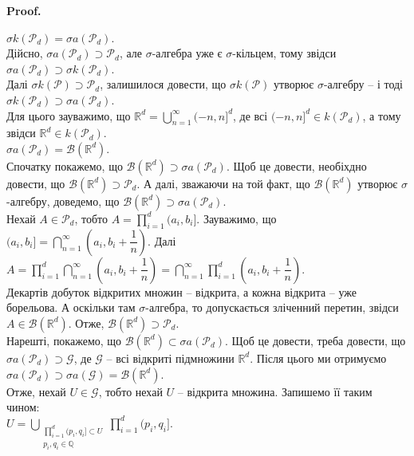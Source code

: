 \documentclass[a4paper, 10pt]{article}
\makeatletter
\theoremstyle{theoremdd}
\renewenvironment{proof}[1][Proof.\\]{\par
\pushQED{\hfill \qed}%
\normalfont \topsep6\p@\@plus6\p@\relax
\trivlist
\item\relax
{\bfseries
#1\@addpunct{.}}\hspace\labelsep\ignorespaces
}{%
\popQED\endtrivlist\@endpefalse
}
\makeatother
\begin{document}
\begin{proof}
$\sigma k(\mathcal{P}_d) = \sigma a(\mathcal{P}_d)$.\\
Дійсно, $\sigma a(\mathcal{P}_d) \supset \mathcal{P}_d$, але $\sigma$-алгебра уже є $\sigma$-кільцем, тому звідси $\sigma a(\mathcal{P}_d) \supset \sigma k(\mathcal{P}_d)$.\\
Далі $\sigma k(\mathcal{P}) \supset \mathcal{P}_d$, залишилося довести, що $\sigma k(\mathcal{P})$ утворює $\sigma$-алгебру -- і тоді $\sigma k(\mathcal{P}_d) \supset \sigma a(\mathcal{P}_d)$. \\
Для цього зауважимо, що $\mathbb{R}^d = \displaystyle\bigcup_{n =1}^\infty (-n,n]^d$, де всі $(-n,n]^d \in k(\mathcal{P}_d)$, а тому звідси $\mathbb{R}^d \in k(\mathcal{P}_d)$.
\bigskip \\
$\sigma a(\mathcal{P}_d) = \mathcal{B}(\mathbb{R}^d)$.\\
Спочатку покажемо, що $\mathcal{B}(\mathbb{R}^d) \supset \sigma a(\mathcal{P}_d)$. Щоб це довести, необіхдно довести, що $\mathcal{B}(\mathbb{R}^d) \supset \mathcal{P}_d$. А далі, зважаючи на той факт, що $\mathcal{B}(\mathbb{R}^d)$ утворює $\sigma$-алгебру, доведемо, що $\mathcal{B}(\mathbb{R}^d) \supset \sigma a(\mathcal{P}_d)$.\\
Нехай $A \in \mathcal{P}_d$, тобто $A = \displaystyle\prod_{i=1}^d (a_i,b_i]$. Зауважимо, що $(a_i,b_i] = \displaystyle\bigcap_{n=1}^\infty \left(a_i,b_i+\dfrac{1}{n}\right)$. Далі\\
$A = \displaystyle\prod_{i=1}^d \bigcap_{n=1}^\infty \left( a_i, b_i + \dfrac{1}{n} \right) = \bigcap_{n=1}^\infty \prod_{i=1}^d \left( a_i, b_i+\dfrac{1}{n}\right)$.\\
Декартів добуток відкритих множин -- відкрита, а кожна відкрита -- уже борельова. А оскільки там $\sigma$-алгебра, то допускається зліченний перетин, звідси $A \in \mathcal{B}(\mathbb{R}^d)$. Отже, $\mathcal{B}(\mathbb{R}^d) \supset \mathcal{P}_d$.\\
Нарешті, покажемо, що $\mathcal{B}(\mathbb{R}^d) \subset \sigma a(\mathcal{P}_d)$. Щоб це довести, треба довести, що $\sigma a(\mathcal{P}_d) \supset \mathcal{G}$, де $\mathcal{G}$ -- всі відкриті підмножини $\mathbb{R}^d$. Після цього ми отримуємо $\sigma a(\mathcal{P}_d) \supset \sigma a(\mathcal{G}) = \mathcal{B}(\mathbb{R}^d)$.\\
Отже, нехай $U \in \mathcal{G}$, тобто нехай $U$ -- відкрита множина. Запишемо її таким чином:\\
$U = \displaystyle\bigcup_{\substack{\prod_{i=1}^d (p_i,q_i] \subset U \\ p_i,q_i \in \mathbb{Q}}} \prod_{i=1}^d (p_i,q_i]$.\\

\end{proof}
\end{document}
